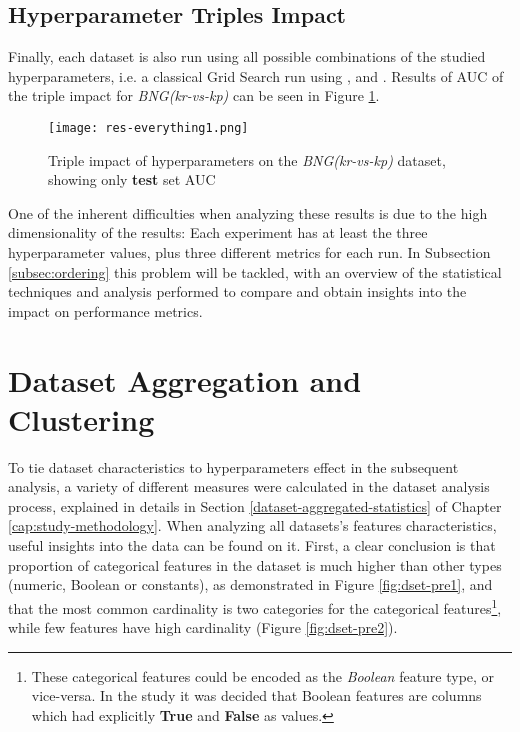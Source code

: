 \subsection{Hyperparameter Triples Impact}
\label{subsec:triple-impact}

Finally, each dataset is also run using all possible combinations of the studied hyperparameters, i.e. a classical Grid Search run using ,  and . Results of AUC of the triple impact for  \textit{BNG(kr-vs-kp)} can be seen in Figure \ref{fig:res-all1}.

\begin{figure}[!h]
    \centering
    \texttt{[image: res-everything1.png]} 
    \caption{Triple impact of hyperparameters on the \textit{BNG(kr-vs-kp)} dataset, showing only \textbf{test} set AUC}
    \label{fig:res-all1}
\end{figure}

One of the inherent difficulties when analyzing these results is due to the high dimensionality of the results: Each experiment has at least the three hyperparameter values, plus three different metrics for each run. In Subsection \ref{subsec:ordering} this problem will be tackled, with an overview of the statistical techniques and analysis performed to compare and obtain insights into the impact on performance metrics.

\section{Dataset Aggregation and Clustering}


To tie dataset characteristics to hyperparameters effect in the subsequent analysis, a variety of different measures were calculated in the dataset analysis process, explained in details in Section \ref{dataset-aggregated-statistics} of Chapter \ref{cap:study-methodology}. When analyzing all datasets's features characteristics, useful insights into the data can be found on it. First, a clear conclusion is that proportion of categorical features in the dataset is much higher than  other types (numeric, Boolean or constants), as demonstrated in Figure \ref{fig:dset-pre1}, and that the most common cardinality is two categories for the categorical features\footnote{These categorical features could be encoded as the \textit{Boolean} feature type, or vice-versa. In the study it was decided that Boolean features are columns which had explicitly \textbf{True} and \textbf{False} as values.}, while few features have high cardinality (Figure \ref{fig:dset-pre2}).

